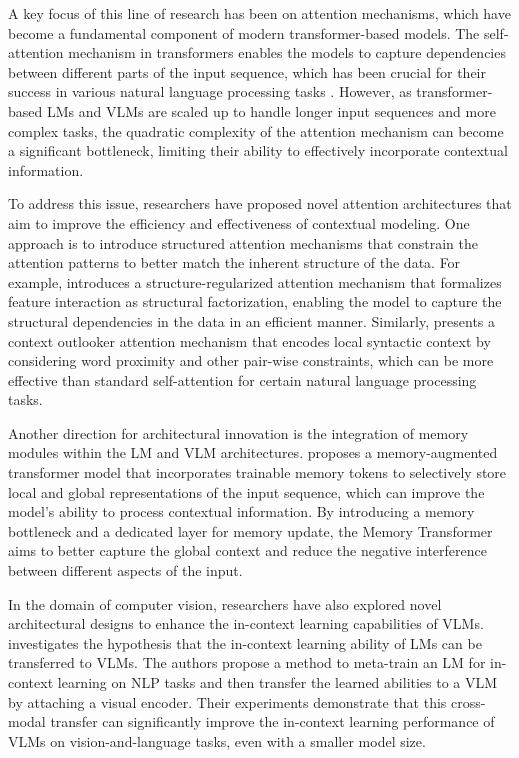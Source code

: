 \documentclass[11pt]{article}
\begin{document}
A key focus of this line of research has been on attention mechanisms, which have become a fundamental component of modern transformer-based models. The self-attention mechanism in transformers enables the models to capture dependencies between different parts of the input sequence, which has been crucial for their success in various natural language processing tasks \cite{ref363}. However, as transformer-based LMs and VLMs are scaled up to handle longer input sequences and more complex tasks, the quadratic complexity of the attention mechanism can become a significant bottleneck, limiting their ability to effectively incorporate contextual information.

To address this issue, researchers have proposed novel attention architectures that aim to improve the efficiency and effectiveness of contextual modeling. One approach is to introduce structured attention mechanisms that constrain the attention patterns to better match the inherent structure of the data. For example, \cite{ref364} introduces a structure-regularized attention mechanism that formalizes feature interaction as structural factorization, enabling the model to capture the structural dependencies in the data in an efficient manner. Similarly, \cite{ref365} presents a context outlooker attention mechanism that encodes local syntactic context by considering word proximity and other pair-wise constraints, which can be more effective than standard self-attention for certain natural language processing tasks.

Another direction for architectural innovation is the integration of memory modules within the LM and VLM architectures. \cite{ref366} proposes a memory-augmented transformer model that incorporates trainable memory tokens to selectively store local and global representations of the input sequence, which can improve the model's ability to process contextual information. By introducing a memory bottleneck and a dedicated layer for memory update, the Memory Transformer aims to better capture the global context and reduce the negative interference between different aspects of the input.

In the domain of computer vision, researchers have also explored novel architectural designs to enhance the in-context learning capabilities of VLMs. \cite{ref241} investigates the hypothesis that the in-context learning ability of LMs can be transferred to VLMs. The authors propose a method to meta-train an LM for in-context learning on NLP tasks and then transfer the learned abilities to a VLM by attaching a visual encoder. Their experiments demonstrate that this cross-modal transfer can significantly improve the in-context learning performance of VLMs on vision-and-language tasks, even with a smaller model size.
\end{document}
